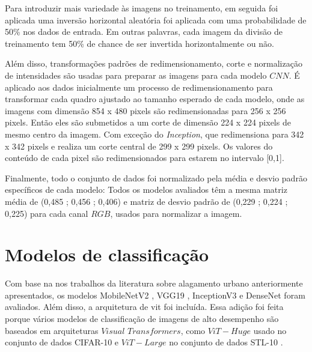 
Para introduzir mais variedade às imagens no treinamento, em seguida foi aplicada uma inversão horizontal aleatória foi aplicada com uma probabilidade de 50\% nos dados de entrada.
Em outras palavras, cada imagem da divisão de treinamento tem 50\% de chance de ser invertida horizontalmente ou não.

Além disso, transformações padrões de redimensionamento, corte e normalização de intensidades são usadas para preparar as imagens para cada modelo $CNN$. 
É aplicado aos dados inicialmente um processo de redimensionamento para transformar cada quadro ajustado ao tamanho esperado de cada modelo,
onde as imagens com dimensão 854 x 480 pixels são redimensionadas para 256 x 256 pixels. 
Então eles são submetidos a um corte de dimensão 224 x 224 pixels de mesmo centro da imagem.
Com exceção do \textit{Inception}, que redimensiona para 342 x 342 pixels e realiza um corte central de 299 x 299 pixels.
Os valores do conteúdo de cada pixel são redimensionados para estarem no intervalo [0,1]. 


Finalmente, todo o conjunto de dados foi normalizado pela média e desvio padrão específicos de cada modelo:
Todos os modelos avaliados têm a mesma matriz média de (0,485 ; 0,456 ; 0,406) e matriz de desvio padrão de (0,229 ; 0,224 ; 0,225) para cada canal $RGB$, usados para normalizar a imagem. 
\section{Modelos de classificação}\label{sec:methodology_models}

Com base na nos trabalhos da literatura sobre alagamento urbano anteriormente apresentados, os modelos MobileNetV2 \cite{mobilenetv2}, VGG19 \cite{vgg}, InceptionV3 \cite{inception} e DenseNet \cite{densenet} foram avaliados.
Além disso, a arquitetura de \acrfull{vit}\cite{vit} foi incluída. Essa adição foi feita porque vários modelos de classificação de imagens de alto desempenho são baseados em arquiteturas $Visual$ $Transformers$, como $ViT-Huge$ usado no conjunto de dados CIFAR-10 \cite{dosovitskiy2021image} e $ViT-Large$ no conjunto de dados STL-10 \cite{gesmundo2022continual, kabir2023reduction}.

